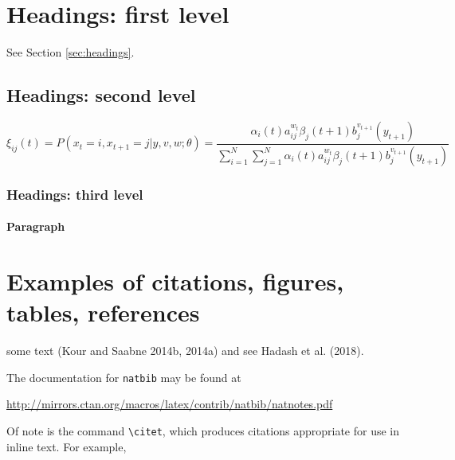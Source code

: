 \documentclass{article}
\begin{document}
\hypertarget{headings-first-level}{%
\section{Headings: first level}\label{headings-first-level}}

\label{sec:headings}

\lipsum[4] See Section \ref{sec:headings}.

\hypertarget{headings-second-level}{%
\subsection{Headings: second level}\label{headings-second-level}}

\lipsum[5]

\[
\xi _{ij}(t)=P(x_{t}=i,x_{t+1}=j|y,v,w;\theta)= {\frac {\alpha _{i}(t)a^{w_t}_{ij}\beta _{j}(t+1)b^{v_{t+1}}_{j}(y_{t+1})}{\sum _{i=1}^{N} \sum _{j=1}^{N} \alpha _{i}(t)a^{w_t}_{ij}\beta _{j}(t+1)b^{v_{t+1}}_{j}(y_{t+1})}}
\]

\hypertarget{headings-third-level}{%
\subsubsection{Headings: third level}\label{headings-third-level}}

\lipsum[6]

\paragraph{Paragraph}
\lipsum[7]

\hypertarget{examples-of-citations-figures-tables-references}{%
\section{Examples of citations, figures, tables,
references}\label{examples-of-citations-figures-tables-references}}

\label{sec:others}

\lipsum[8] some text (Kour and Saabne 2014b, 2014a) and see Hadash et
al. (2018).

The documentation for \verb+natbib+ may be found at

\begin{center}
  \url{http://mirrors.ctan.org/macros/latex/contrib/natbib/natnotes.pdf}
\end{center}

Of note is the command \verb+\citet+, which produces citations
appropriate for use in inline text. For example,
\end{document}
